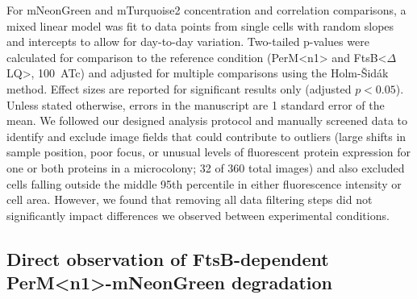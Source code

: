 \documentclass[pdflatex,sn-nature]{sn-jnl}%
\def\textsuperscript#1{<#1>}%
\newcommand\ftsbdLQ{FtsB\textsuperscript{$\Delta{}$LQ}}
\newcommand\permN{PerM\textsuperscript{n1}}
\begin{document}
For mNeonGreen and mTurquoise2 concentration and correlation comparisons, a mixed linear model was fit to data points from single cells with random slopes and intercepts to allow for day-to-day variation.
Two-tailed p-values were calculated for comparison to the reference condition (\permN{} and \ftsbdLQ{}, \qty{100}{\nM}~ATc) and adjusted for multiple comparisons using the Holm-Šidák method.
Effect sizes are reported for significant results only (adjusted $p<0.05$).
Unless stated otherwise, errors in the manuscript are 1 standard error of the mean.
We followed our designed analysis protocol and manually screened data to identify and exclude image fields that could contribute to outliers (large shifts in sample position, poor focus, or unusual levels of fluorescent protein expression for one or both proteins in a microcolony; 32 of 360 total images) and also excluded cells falling outside the middle 95th percentile in either fluorescence intensity or cell area.
However, we found that removing all data filtering steps did not significantly impact differences we observed between experimental conditions.

\subsection{Direct observation of FtsB-dependent \permN{}-mNeonGreen degradation}
\end{document}
